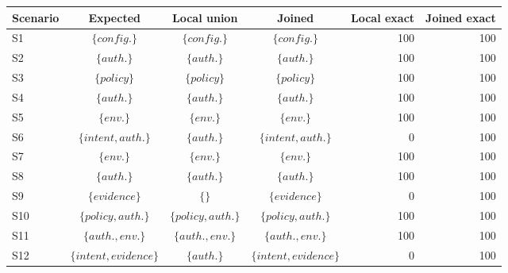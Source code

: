 \begin{tabular}{@{}lccc rr@{}}
\toprule
Scenario & Expected & Local union & Joined & Local exact & Joined exact \\
\midrule
S1 & $\{config.\}$ & $\{config.\}$ & $\{config.\}$ & 100 & 100 \\
S2 & $\{auth.\}$ & $\{auth.\}$ & $\{auth.\}$ & 100 & 100 \\
S3 & $\{policy\}$ & $\{policy\}$ & $\{policy\}$ & 100 & 100 \\
S4 & $\{auth.\}$ & $\{auth.\}$ & $\{auth.\}$ & 100 & 100 \\
S5 & $\{env.\}$ & $\{env.\}$ & $\{env.\}$ & 100 & 100 \\
S6 & $\{intent,auth.\}$ & $\{auth.\}$ & $\{intent,auth.\}$ & 0 & 100 \\
S7 & $\{env.\}$ & $\{env.\}$ & $\{env.\}$ & 100 & 100 \\
S8 & $\{auth.\}$ & $\{auth.\}$ & $\{auth.\}$ & 100 & 100 \\
S9 & $\{evidence\}$ & $\{\}$ & $\{evidence\}$ & 0 & 100 \\
S10 & $\{policy,auth.\}$ & $\{policy,auth.\}$ & $\{policy,auth.\}$ & 100 & 100 \\
S11 & $\{auth.,env.\}$ & $\{auth.,env.\}$ & $\{auth.,env.\}$ & 100 & 100 \\
S12 & $\{intent,evidence\}$ & $\{auth.\}$ & $\{intent,evidence\}$ & 0 & 100 \\
\bottomrule
\end{tabular}
